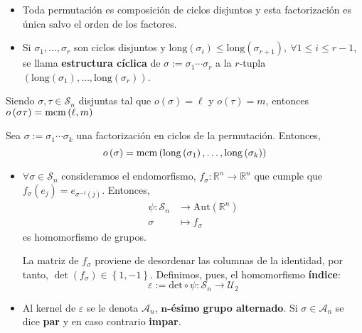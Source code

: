 \begin{prop}
\begin{itemize}
    \item Toda permutación es composición de ciclos disjuntos y esta factorización es única salvo el orden de los factores.
    \item Si $\sigma_1, \ldots, \sigma_r$ son ciclos disjuntos y $\mathrm{long}\left( \sigma_i \right) \le \mathrm{long}\left( \sigma_{r+1} \right),\ \forall 1 \le i \le r-1$, se llama \textbf{estructura cíclica} de $\sigma := \sigma_1 \cdots \sigma_r$ a la $r$-tupla $\left( \mathrm{long}\left( \sigma_1 \right), \ldots, \mathrm{long}\left( \sigma_r \right) \right)$.
\end{itemize}
\end{prop}

\begin{lema}
Siendo $\sigma, \tau \in \mathcal{S}_n$ disjuntas tal que $o\left( \sigma \right) = \ell$ y $o\left( \tau \right) = m$, entonces $o\left( \sigma \tau \right) = \operatorname{mcm}\left( \ell, m \right)$
\end{lema}

\begin{coro}
Sea $\sigma := \sigma_1 \cdots \sigma_k$ una factorización en ciclos de la permutación. Entonces,
\[
o\left( \sigma \right) = \operatorname{mcm}\left( \mathrm{long}\left( \sigma_1 \right), \ldots, \mathrm{long}\left( \sigma_k \right) \right)
\]
\end{coro}

\begin{defi}[Índice]
\begin{itemize}
\item $\forall \sigma \in \mathcal{S}_n$ consideramos el endomorfismo, $f_{\sigma} : \mathbb{R}^n \rightarrow \mathbb{R}^n$ que cumple que $f_{\sigma}\left( e_j \right) = e_{\sigma^{-1}\left( j \right)}$. Entonces,
\begin{align*}
    \psi: \mathcal{S}_n &\rightarrow \mathrm{Aut}\left( \mathbb{R}^n \right)\\
    \sigma &\mapsto f_{\sigma}
\end{align*}
es homomorfismo de grupos.

La matriz de $f_{\sigma}$ proviene de desordenar las columnas de la identidad, por tanto, $\det \left( f_{\sigma} \right) \in \left\{ 1, -1 \right\}$. Definimos, pues, el homomorfismo \textbf{índice}:
\[
    \varepsilon := \mathrm{det} \circ \psi: \mathcal{S}_n \rightarrow \mathcal{U}_2
\]

\item Al kernel de $\varepsilon$ se le denota $\mathcal{A}_n$, \textbf{$\mathbf{n}$-ésimo grupo alternado}. Si $\sigma \in \mathcal{A}_n$ se dice \textbf{par} y en caso contrario \textbf{impar}.
\end{itemize} 
\end{defi}

